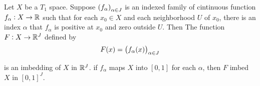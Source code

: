 \begin{theorem}
    Let $X$ be a $T_1$ space. Suppose $\sequence{f_\alpha}_{\alpha \in J}$ is an indexed family of cintinuous function $f_\alpha : X \rightarrow \mathbb{R}$ such that for each $x_0\in X$ and each neighborhood $U$ of $x_0$, there is an index $\alpha$ that $f_\alpha$ is positive at $x_0$ and zero outside $U$. Then The function $F: X \rightarrow \mathbb{R}^J$ defined by 
    \begin{equation}
        F(x) = \mleft(f_\alpha(x)\mright)_{\alpha \in J}
    \end{equation}
    
    is an imbedding of $X$ in $\mathbb{R}^J$. if $f_\alpha$ maps $X$ into $[0,1]$ for each $\alpha$, then $F$ imbed $X$ in $[0,1]^J$.
\end{theorem}


